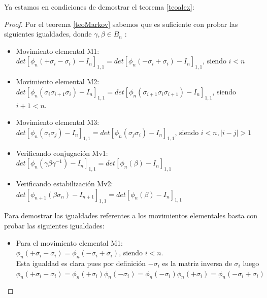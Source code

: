 \bigskip
 Ya estamos en condiciones de demostrar el teorema \ref{teoalex}:
 \begin{proof}
 	Por el teorema \ref{teoMarkov} sabemos que es suficiente con probar las siguientes igualdades, donde $ \gamma, \beta \in B_{n} $ :
 	\begin{itemize}
 		\item Movimiento elemental M1: \\
 		$ det[\phi_{n}(+\sigma_{i}-\sigma_{i}) - I_{n}]_{1,1} = det[\phi_{n}(-\sigma_{i}+\sigma_{i}) - I_{n}]_{1,1}$, siendo $i<n$
 		\item Movimiento elemental M2: \\
 		$ det[\phi_{n}(\sigma_{i}\sigma_{i+1}\sigma_{i}) - I_{n}]_{1,1} = det[\phi_{n}(\sigma_{i+1}\sigma_{i}\sigma_{i+1}) - I_{n}]_{1,1}$, siendo $ i+1<n $.
 		\item Movimiento elemental M3:\\
 		$ det[\phi_{n}(\sigma_{i}\sigma_{j}) - I_{n}]_{1,1} = det[\phi_{n}(\sigma_{j}\sigma_{i}) - I_{n}]_{1,1}$, siendo $i<n, |i-j| > 1$
 		\item Verificando conjugación Mv1: $ det[\phi_{n}(\gamma\beta\gamma^{-1}) - I_{n}]_{1,1} = det[\phi_{n}(\beta) - I_{n}]_{1,1}$ 
 		\item Verificando estabilización Mv2: $ det[\phi_{n+1}(\beta\sigma_{n}) - I_{n+1}]_{1,1} = det[\phi_{n}(\beta) - I_{n}]_{1,1}$   
  	\end{itemize}
	 Para demostrar las igualdades referentes a los movimientos elementales basta con probar las siguientes igualdades:
	 \begin{itemize}
	 	 \item Para el movimiento elemental M1: \\
	 	 $ \phi_{n}(+\sigma_{i}-\sigma_{i}) = \phi_{n}(-\sigma_{i}+\sigma_{i})$, siendo $i<n$.\\
	 	 Esta igualdad es clara pues por definición $-\sigma_{i}$ es la matriz inversa de $\sigma_{i}$  luego $ \phi_{n}(+\sigma_{i}-\sigma_{i}) = \phi_{n}(+\sigma_{i})\phi_n(-\sigma_{i}) = \phi_{n}(-\sigma_{i})\phi_n(+\sigma_{i}) = \phi_{n}(-\sigma_{i}+\sigma_{i})$
	 	 

\end{itemize}
\end{proof}
